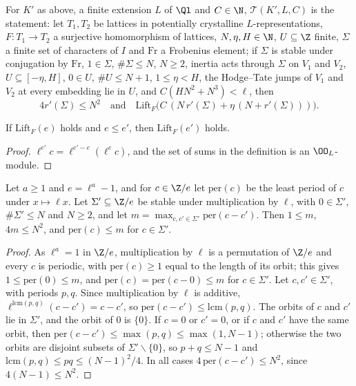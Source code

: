 \begin{definition}\label{pf:linkN:Tstmt}
For $K'$ as above, a finite extension $L$ of $\Ql$ and $C\in\N$, $\mathcal T(K',L,C)$ is the statement: let $T_1,T_2$ be lattices in
potentially crystalline $L$-representations, $F:T_1\to T_2$ a surjective homomorphism of lattices, $N,\eta,H\in\N$, $U\subseteq\Z$ finite,
$\Sigma$ a finite set of characters of $I$ and $\mathrm{Fr}$ a Frobenius element; if $\Sigma$ is stable under conjugation by $\mathrm{Fr}$,
$1\in\Sigma$, $\#\Sigma\le N$, $N\ge2$, inertia acts through $\Sigma$ on $V_1$ and $V_2$, $U\subseteq[-\eta,H]$, $0\in U$, $\#U\le N+1$,
$1\le\eta<H$, the Hodge--Tate jumps of $V_1$ and $V_2$ at every embedding lie in $U$, and $C(HN^2+N^3)<\ell$, then
\[
4r'(\Sigma)\le N^2\quad\text{and}\quad\mathrm{Lift}_F\bigl(C\,(N\,r'(\Sigma)+\eta\,(N+r'(\Sigma)))\bigr).
\]
\end{definition}

\begin{lemma}\label{pf:linkN:liftmono}
If $\mathrm{Lift}_F(e)$ holds and $e\le e'$, then $\mathrm{Lift}_F(e')$ holds.
\end{lemma}

\begin{proof}
$\ell^{e'}c=\ell^{e'-e}(\ell^ec)$, and the set of sums in the definition is an $\OO_L$-module.
\end{proof}

\begin{lemma}\label{pf:linkN:orbits}
Let $a\ge1$ and $e=\ell^a-1$, and for $c\in\Z/e$ let $\mathrm{per}(c)$ be the least period of $c$ under $x\mapsto\ell x$. Let $\Sigma'\subseteq\Z/e$
be stable under multiplication by $\ell$, with $0\in\Sigma'$, $\#\Sigma'\le N$ and $N\ge2$, and let $m=\max_{c,c'\in\Sigma'}\mathrm{per}(c-c')$.
Then $1\le m$, $4m\le N^2$, and $\mathrm{per}(c)\le m$ for $c\in\Sigma'$.
\end{lemma}

\begin{proof}
As $\ell^a=1$ in $\Z/e$, multiplication by $\ell$ is a permutation of $\Z/e$ and every $c$ is periodic, with $\mathrm{per}(c)\ge1$ equal to the
length of its orbit; this gives $1\le\mathrm{per}(0)\le m$, and $\mathrm{per}(c)=\mathrm{per}(c-0)\le m$ for $c\in\Sigma'$. Let $c,c'\in\Sigma'$, with
periods $p,q$. Since multiplication by $\ell$ is additive, $\ell^{\mathrm{lcm}(p,q)}(c-c')=c-c'$, so $\mathrm{per}(c-c')\le\mathrm{lcm}(p,q)$. The orbits
of $c$ and $c'$ lie in $\Sigma'$, and the orbit of $0$ is $\{0\}$. If $c=0$ or $c'=0$, or if $c$ and $c'$ have the same orbit, then
$\mathrm{per}(c-c')\le\max(p,q)\le\max(1,N-1)$; otherwise the two orbits are disjoint subsets of $\Sigma'\smallsetminus\{0\}$, so $p+q\le N-1$ and
$\mathrm{lcm}(p,q)\le pq\le(N-1)^2/4$. In all cases $4\,\mathrm{per}(c-c')\le N^2$, since $4(N-1)\le N^2$.
\end{proof}

